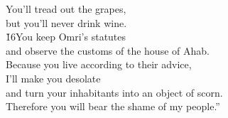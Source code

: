 \begin{poetry}
\poeml You'll tread out the grapes, \\
\poemll    but you'll never drink wine. \\
\poeml \v{16}You keep Omri's statutes \\
\poemll    and observe the customs of the house of Ahab. \\
\poeml Because you live according to their advice, \\
\poemll    I'll make you desolate \\
\poemlll       and turn your inhabitants into an object of scorn. \\
\poeml Therefore you will bear the shame of my people.''
\end{poetry}

